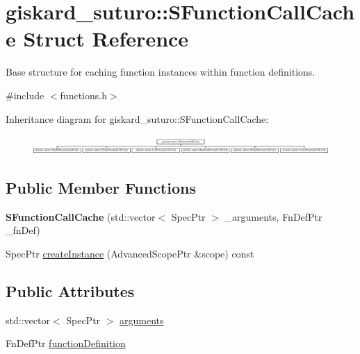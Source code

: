 \hypertarget{structgiskard__suturo_1_1SFunctionCallCache}{\section{giskard\-\_\-suturo\-:\-:S\-Function\-Call\-Cache Struct Reference}
\label{structgiskard__suturo_1_1SFunctionCallCache}
}


Base structure for caching function instances within function definitions.  




{\ttfamily \#include $<$functions.\-h$>$}

Inheritance diagram for giskard\-\_\-suturo\-:\-:S\-Function\-Call\-Cache\-:\begin{figure}[H]
\begin{center}
\leavevmode
\includegraphics[height=0.712468cm]{structgiskard__suturo_1_1SFunctionCallCache}
\end{center}
\end{figure}
\subsection*{Public Member Functions}
\begin{DoxyCompactItemize}
\item 
\hypertarget{structgiskard__suturo_1_1SFunctionCallCache_a217492912917c2feff763d95642d06e9}{{\bfseries S\-Function\-Call\-Cache} (std\-::vector$<$ Spec\-Ptr $>$ \-\_\-arguments, Fn\-Def\-Ptr \-\_\-fn\-Def)}\label{structgiskard__suturo_1_1SFunctionCallCache_a217492912917c2feff763d95642d06e9}

\item 
Spec\-Ptr \hyperlink{structgiskard__suturo_1_1SFunctionCallCache_a311cb369df0c944afdbc525dd0c9d7b1}{create\-Instance} (Advanced\-Scope\-Ptr \&scope) const 
\end{DoxyCompactItemize}
\subsection*{Public Attributes}
\begin{DoxyCompactItemize}
\item 
std\-::vector$<$ Spec\-Ptr $>$ \hyperlink{structgiskard__suturo_1_1SFunctionCallCache_ad522b77747b469ad5c507f26dd6c74ae}{arguments}
\item 
Fn\-Def\-Ptr \hyperlink{structgiskard__suturo_1_1SFunctionCallCache_ab6e8b1ddb5c910291204be2de2d633df}{function\-Definition}
\end{DoxyCompactItemize}



